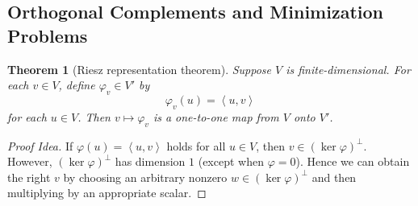 \documentclass[nofonts,colorlinks]{tufte-handout}
\theoremstyle{plain} %
\newtheorem{thm}{Theorem}
\theoremstyle{definition}
\theoremstyle{remark}
\def\idea{\textit{\color[rgb]{0,0,.55}Proof Idea. }}
\newcounter{peq} %
\newenvironment{peq}{%
   \equation
   \refstepcounter{peq}
   \tag{\thepeq}
}{%
   \endequation
}
\newcommand{\bra}[1]{\mathopen{}\left(#1\right)}
\newcommand{\norm}[1]{\mathopen{}\left\lVert#1\right\rVert}
\newcommand{\inp}[2]{\mathopen{}\left\langle#1,#2\right\rangle}
\newcommand{\abs}[1]{\mathopen{}\left|#1\right|}
\renewcommand{\phi}{\varphi}
\begin{document}
\subsection{Orthogonal Complements and Minimization Problems}
\begin{thm}[Riesz representation theorem]
	Suppose $V$ is finite-dimensional. For each $v\in V$, define $\phi_v\in V'$ by
	\[\phi_v(u)=\inp{u}{v}\]
	for each $u\in V$. Then $v\mapsto\phi_v$ is a one-to-one map from $V$ onto $V'$.%
\end{thm}
\begin{proof}[Proof Idea]
	If $\phi(u)=\inp{u}{v}$ holds for all $u\in V$, then $v\in(\ker\phi)^\perp$. However, $(\ker\phi)^\perp$ has dimension $1$ (except when $\phi=0$). Hence we can obtain the right $v$ by choosing an arbitrary nonzero $w\in(\ker\phi)^\perp$ and then multiplying by an appropriate scalar.
\end{proof}

\end{document}

